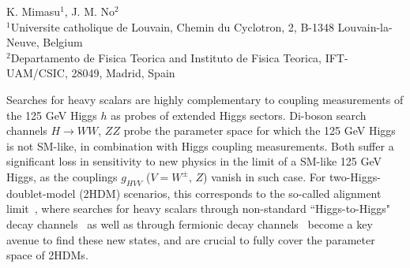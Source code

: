 
\begin{center}
 {K. Mimasu$^{1}$, J. M. No$^{2}$ \\
}
 {\small $^{1}$Universite catholique de Louvain, Chemin du Cyclotron, 2, B-1348 Louvain-la-Neuve, Belgium \\
 $^{2}$Departamento de Fisica Teorica and Instituto de Fisica Teorica, IFT-UAM/CSIC, 28049, Madrid, Spain}
\end{center}

\vspace{2mm}







Searches for heavy scalars are highly complementary to coupling measurements of the 125 GeV Higgs $h$ as probes of extended Higgs sectors. Di-boson search channels $H \to WW$, $ZZ$ probe the parameter space for which the 125 GeV Higgs is not SM-like, in combination with Higgs coupling measurements. Both suffer a significant loss in sensitivity to new physics in the limit of a SM-like 125 GeV Higgs, as the couplings $g_{HVV}$ ($V = W^{\pm},\,Z$) vanish in such case. For two-Higgs-doublet-model (2HDM) scenarios, this corresponds to the so-called alignment limit~\cite{Gunion:2002zf},
where searches for heavy scalars through non-standard ``Higgs-to-Higgs"
decay channels~\cite{Coleppa:2014hxa,Dorsch:2014qja,Li:2015lra,Kling:2016opi,Dorsch:2016tab} 
as well as through fermionic decay channels~\cite{Craig:2015jba,Gori:2016zto} become a key avenue to find these new states, and are crucial to fully cover the parameter space of 2HDMs.

